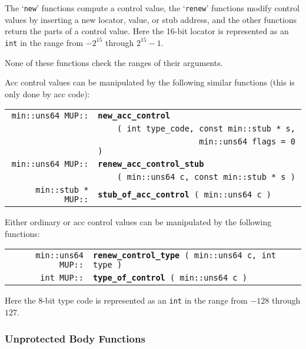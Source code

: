 \documentclass[12pt]{article}
\makeatletter
\newcommand{\ttindex}[1]{\index{#1@{\tt #1}}}
\newcommand{\MUPindex}[1]{\ttindex{MUP::#1}\ttindex{#1}}
\newenvironment{indpar}[1][0.3in]%
	{\begin{list}{}%
		     {\setlength{\itemsep}{0in}%
		      \setlength{\topsep}{0in}%
		      \setlength{\parsep}{1ex}%
		      \setlength{\labelwidth}{#1}%
		      \setlength{\leftmargin}{#1}%
		      \addtolength{\leftmargin}{\labelsep}}%
	 \item}%
	{\end{list}}
\newcommand{\LABEL}[1]{\label{#1}}
\newcommand{\MUPKEY}[1]{{\tt \bf #1}\MUPindex{#1}}
\makeatother
\begin{document}
The `{\tt new}' functions compute a control value,
the `{\tt renew}' functions modify control values
by inserting a new locator, value, or stub address, and
the other functions return the parts of a control value.
Here the 16-bit locator is represented as an \verb|int|
in the range from $-2^{15}$ through $2^{15}-1$.

None of these functions check the ranges of their arguments.

Acc control values can be manipulated by the following similar functions
(this is only done by acc code):

\begin{indpar}\begin{tabular}{@{}r@{}l@{}}
\verb|min::uns64 MUP::|
    & \MUPKEY{new\_acc\_control} \\
    & \verb|    ( int type_code, const min::stub * s,| \\
    & \verb|                     min::uns64 flags = 0 )|
\LABEL{MUP::NEW_ACC_CONTROL_OF_STUB} \\
\verb|min::uns64 MUP::|
    & \MUPKEY{renew\_acc\_control\_stub} \\
    & \verb|    ( min::uns64 c, const min::stub * s )|
\LABEL{MUP::RENEW_ACC_CONTROL_STUB} \\
\verb|min::stub * MUP::|
    & \MUPKEY{stub\_of\_acc\_control}\verb| ( min::uns64 c )|
\LABEL{MUP::STUB_OF_ACC_CONTROL} \\
\end{tabular}\end{indpar}

Either ordinary or acc control values can be
manipulated by the following functions:

\begin{indpar}\begin{tabular}{@{}r@{}l@{}}
\verb|min::uns64 MUP::|
    & \MUPKEY{renew\_control\_type}\verb| ( min::uns64 c, int type )|
\LABEL{MUP::RENEW_CONTROL_TYPE} \\
\verb|int MUP::| & \MUPKEY{type\_of\_control}\verb| ( min::uns64 c )|
\LABEL{MUP::TYPE_OF_CONTROL} \\
\end{tabular}\end{indpar}

Here the 8-bit type code is represented as an {\tt int} in
the range from $-128$ through $127$.

\subsubsection{Unprotected Body Functions}
\label{UNPROTECTED-BODY-FUNCTIONS}
\end{document}
